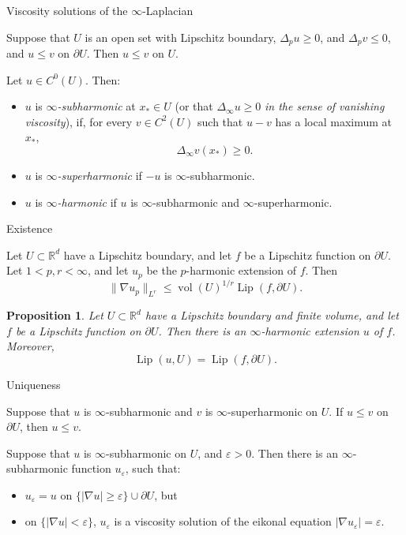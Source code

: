 \documentclass[10pt]{beamer}
\newcommand{\RR}{\mathbb{R}}
\DeclareMathOperator{\Lip}{Lip}
\newtheorem{proposition}{Proposition}
\begin{document}
\begin{frame}{Viscosity solutions of the $\infty$-Laplacian}
\begin{lemma}
Suppose that $U$ is an open set with Lipschitz boundary, $\Delta_p u \geq 0$, and $\Delta_p v \leq 0$, and $u \leq v$ on $\partial U$.
Then $u \leq v$ on $U$.
\end{lemma}   
 
\begin{definition}
Let $u \in C^0(U)$. Then:
\begin{itemize}
\item $u$ is \emph{$\infty$-subharmonic} at $x_* \in U$ (or that $\Delta_\infty u \geq 0$ \emph{in the sense of vanishing viscosity}), if, for every $v \in C^2(U)$ such that $u - v$ has a local maximum at $x_*$,
$$\Delta_\infty v(x_*) \geq 0.$$
\item $u$ is \emph{$\infty$-superharmonic} if $-u$ is $\infty$-subharmonic.
\item $u$ is \emph{$\infty$-harmonic} if $u$ is $\infty$-subharmonic and $\infty$-superharmonic.
\end{itemize}
\end{definition}
\end{frame}

\begin{frame}{Existence}
\begin{lemma}
Let $U \subset \RR^d$ have a Lipschitz boundary, and let $f$ be a Lipschitz function on $\partial U$.
Let $1 < p, r < \infty$, and let $u_p$ be the $p$-harmonic extension of $f$. Then
$$\|\nabla u_p\|_{L^r} \leq \operatorname{vol}(U)^{1/r} \Lip(f, \partial U) .$$
\end{lemma}
 
\begin{proposition}
Let $U \subset \RR^d$ have a Lipschitz boundary and finite volume, and let $f$ be a Lipschitz function on $\partial U$.
Then there is an $\infty$-harmonic extension $u$ of $f$. Moreover,
$$\Lip(u, U) = \Lip(f, \partial U).$$
\end{proposition}
\end{frame}

\begin{frame}{Uniqueness}
\begin{theorem}
Suppose that $u$ is $\infty$-subharmonic and $v$ is $\infty$-superharmonic on $U$.
If $u \leq v$ on $\partial U$, then $u \leq v$.
\end{theorem}

\begin{lemma}
Suppose that $u$ is $\infty$-subharmonic on $U$, and $\varepsilon > 0$.
Then there is an $\infty$-subharmonic function $u_\varepsilon$, such that: 
\begin{itemize}
\item $u_\varepsilon = u$ on $\{|\nabla u| \geq \varepsilon\} \cup \partial U$, but  
\item on $\{|\nabla u| < \varepsilon\}$, $u_\varepsilon$ is a viscosity solution of the eikonal equation $|\nabla u_\varepsilon| = \varepsilon$.
\end{itemize}
\end{lemma}
\end{frame}
\end{document}
